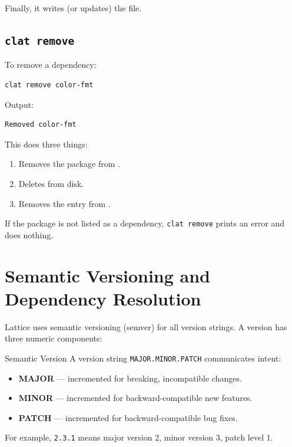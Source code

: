 Finally, it writes (or updates) the  file.

\subsection{\texttt{clat remove}}\label{subsec:clat-remove}

To remove a dependency:

\begin{lstlisting}[language=bash, numbers=none]
clat remove color-fmt
\end{lstlisting}

Output:

\begin{lstlisting}[language=bash, numbers=none]
Removed color-fmt
\end{lstlisting}

This does three things:

\begin{enumerate}
  \item Removes the package from .
  \item Deletes  from disk.
  \item Removes the entry from .
\end{enumerate}

If the package is not listed as a dependency, \texttt{clat remove} prints an error and does nothing.

\section{Semantic Versioning and Dependency Resolution}\label{sec:semver}

Lattice uses semantic versioning (semver) for all version strings.
A version has three numeric components:

\begin{defnbox}{Semantic Version}
A version string \texttt{MAJOR.MINOR.PATCH} communicates intent:

\begin{itemize}[nosep]
  \item \textbf{MAJOR} --- incremented for breaking, incompatible changes.
  \item \textbf{MINOR} --- incremented for backward-compatible new features.
  \item \textbf{PATCH} --- incremented for backward-compatible bug fixes.
\end{itemize}

For example, \texttt{2.3.1} means major version 2, minor version 3, patch level 1.
\end{defnbox}

